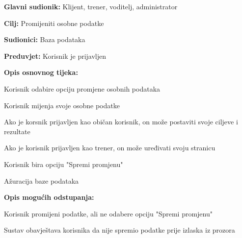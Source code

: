 					
					\noindent {}
					\begin{packed_item}
	
						\item \textbf{Glavni sudionik: }Klijent, trener, voditelj, administrator
						\item  \textbf{Cilj:} Promijeniti osobne podatke
						\item  \textbf{Sudionici:} Baza podataka
						\item  \textbf{Preduvjet:} Korisnik je prijavljen
						\item  \textbf{Opis osnovnog tijeka:}
						
						\item[] \begin{packed_enum}

							\item Korisnik odabire opciju promjene osobnih podataka
							\item Korisnik mijenja svoje osobne podatke
							\begin{packed_item}
	
							\item Ako je korsnik prijavljen kao običan korisnik, on može postaviti svoje ciljeve i rezultate
							\item Ako je korisnik prijavljen kao trener, on može uređivati svoju stranicu
						\end{packed_item}
							\item Korisnik bira opciju "Spremi promjenu"
							\item Ažuracija baze podataka
						\end{packed_enum}
					
						\item  \textbf{Opis mogućih odstupanja:}
						
						\item[] \begin{packed_item}
	
							\item[-]
						Korisnik promijeni podatke, ali ne odabere opciju "Spremi promjenu"
							\item[] \begin{packed_enum}
								
								\item Sustav obavještava korisnika da nije spremio podatke prije izlaska iz prozora
							\end{packed_enum}
						\end{packed_item}
					\end{packed_item}
					
